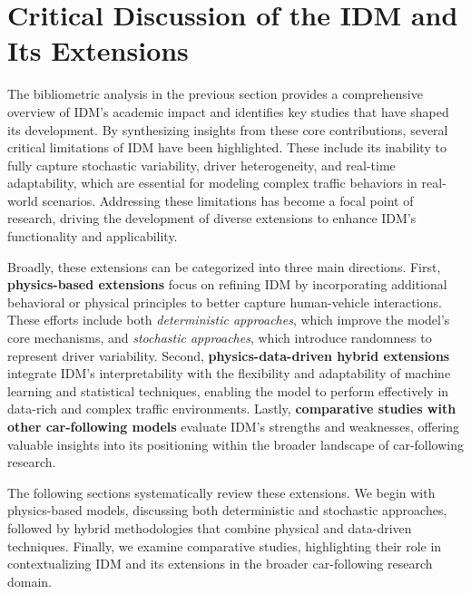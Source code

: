 \documentclass[a4paper,fleqn]{cas-sc}
\begin{document}

\section{Critical Discussion of the IDM and Its Extensions}
\label{sec:limitations}
The bibliometric analysis in the previous section provides a comprehensive overview of IDM’s academic impact and identifies key studies that have shaped its development. By synthesizing insights from these core contributions, several critical limitations of IDM have been highlighted. These include its inability to fully capture stochastic variability, driver heterogeneity, and real-time adaptability, which are essential for modeling complex traffic behaviors in real-world scenarios. Addressing these limitations has become a focal point of research, driving the development of diverse extensions to enhance IDM’s functionality and applicability.

Broadly, these extensions can be categorized into three main directions. First, \textbf{physics-based extensions} focus on refining IDM by incorporating additional behavioral or physical principles to better capture human-vehicle interactions. These efforts include both \textit{deterministic approaches}, which improve the model’s core mechanisms, and \textit{stochastic approaches}, which introduce randomness to represent driver variability. Second, \textbf{physics-data-driven hybrid extensions} integrate IDM’s interpretability with the flexibility and adaptability of machine learning and statistical techniques, enabling the model to perform effectively in data-rich and complex traffic environments. Lastly, \textbf{comparative studies with other car-following models} evaluate IDM’s strengths and weaknesses, offering valuable insights into its positioning within the broader landscape of car-following research.

The following sections systematically review these extensions. We begin with physics-based models, discussing both deterministic and stochastic approaches, followed by hybrid methodologies that combine physical and data-driven techniques. Finally, we examine comparative studies, highlighting their role in contextualizing IDM and its extensions in the broader car-following research domain.
\end{document}
